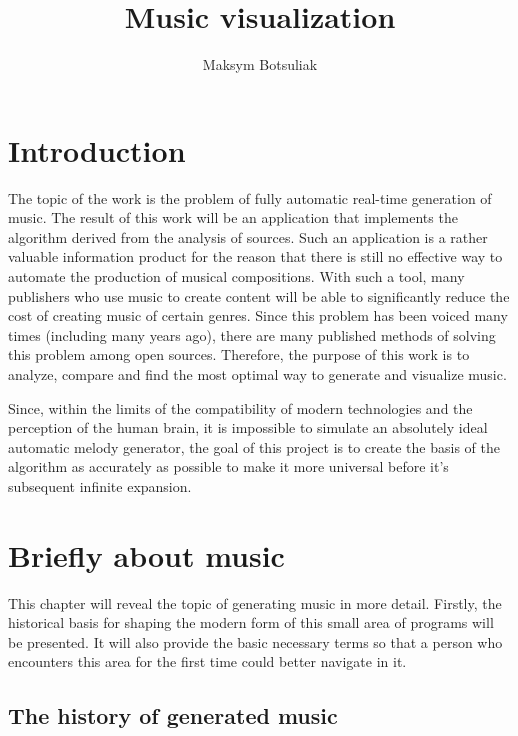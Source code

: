 \documentclass[thesis=B,english]{FITthesis}[2019/12/23]
\title{Music visualization}
\author{Maksym Botsuliak} %
\begin{document}
% 

\chapter{Introduction}

The topic of the work is the problem of fully automatic real-time generation of music. The result of this work will be an application that implements the algorithm derived from the analysis of sources. Such an application is a rather valuable information product for the reason that there is still no effective way to automate the production of musical compositions. With such a tool, many publishers who use music to create content will be able to significantly reduce the cost of creating music of certain genres. Since this problem has been voiced many times (including many years ago), there are many published methods of solving this problem among open sources. Therefore, the purpose of this work is to analyze, compare and find the most optimal way to generate and visualize music.

Since, within the limits of the compatibility of modern technologies and the perception of the human brain, it is impossible to simulate an absolutely ideal automatic melody generator, the goal of this project is to create the basis of the algorithm as accurately as possible to make it more universal before it's subsequent infinite expansion.



\chapter{Briefly about music}

This chapter will reveal the topic of generating music in more detail. Firstly, the historical basis for shaping the modern form of this small area of programs will be presented. It will also provide the basic necessary terms so that a person who encounters this area for the first time could better navigate in it.

\section{The history of generated music}
\end{document}
